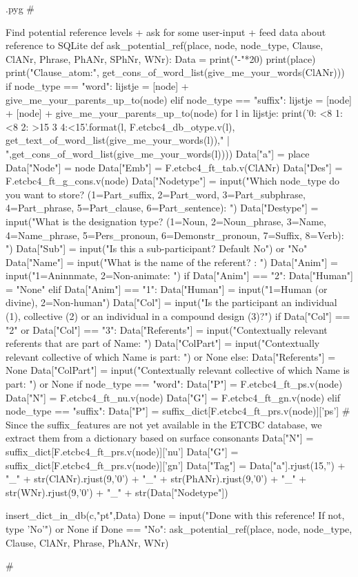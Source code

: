 \documentclass{report}
\makeatletter
\newenvironment{python}{%
  \VerbatimEnvironment
  \minted@resetoptions
  \setkeys{minted@opt}{}
      \begin{VerbatimOut}{\jobname.pyg}}
{%
      \end{VerbatimOut}
      \minted@pygmentize{python}
      \DeleteFile{\jobname.pyg}}
\makeatother
\begin{document}
\begin{python}
#{{{ Find potential reference levels + ask for some user-input + feed data about reference to SQLite
def ask_potential_ref(place, node, node_type, Clause, ClANr, Phrase, PhANr, SPhNr, WNr):
        Data = {}
        print("-"*20)
        print(place)
        print("Clause_atom:", get_cons_of_word_list(give_me_your_words(ClANr)))
        if node_type == "word":
                lijstje = [node] + give_me_your_parents_up_to(node)
        elif node_type == "suffix":
                lijstje = [node] + [node] + give_me_your_parents_up_to(node)
        for l in lijstje:
                print('{0: <8} {1: <8} {2: >15} {3} {4:<15}'.format(l, F.etcbc4_db_otype.v(l), get_text_of_word_list(give_me_your_words(l))," | ",get_cons_of_word_list(give_me_your_words(l))))
        Data["a"] = place
        Data["Node"] = node
        Data["Emb"] = F.etcbc4_ft_tab.v(ClANr)
        Data["Des"] = F.etcbc4_ft_g_cons.v(node)
        Data["Nodetype"] = input("Which node_type do you want to store? (1=Part_suffix, 2=Part_word, 3=Part_subphrase, 4=Part_phrase, 5=Part_clause, 6=Part_sentence): ")
        Data["Destype"] = input("What is the designation type? (1=Noun, 2=Noun_phrase, 3=Name, 4=Name_phrase, 5=Pers_pronoun, 6=Demonstr_pronoun, 7=Suffix, 8=Verb): ")
        Data["Sub"] = input("Is this a sub-participant? Default No") or "No"
        Data["Name"] = input("What is the name of the referent? : ")
        Data["Anim"] = input("1=Aninnmate, 2=Non-animate: ")
        if Data["Anim"] == "2":
            Data["Human"] = "None"
        elif Data["Anim"] == "1":
            Data["Human"] = input("1=Human (or divine), 2=Non-human")
        Data["Col"] = input("Is the participant an individual (1), collective (2) or an individual in a compound design (3)?")
        if Data["Col"] == "2" or Data["Col"] == "3":
            Data["Referents"] = input("Contextually relevant referents that are part of Name: ")
            Data["ColPart"] = input("Contextually relevant collective of which Name is part: ") or None
        else:
            Data["Referents"] = None
            Data["ColPart"] = input("Contextually relevant collective of which Name is part: ") or None
        if node_type == "word":
            Data["P"] = F.etcbc4_ft_ps.v(node)
            Data["N"] = F.etcbc4_ft_nu.v(node)
            Data["G"] = F.etcbc4_ft_gn.v(node)
        elif node_type == "suffix":
            Data["P"] = suffix_dict[F.etcbc4_ft_prs.v(node)]['ps']    # Since the suffix_features are not yet available in the ETCBC database, we extract them from a dictionary based on surface consonants
            Data["N"] = suffix_dict[F.etcbc4_ft_prs.v(node)]['nu']
            Data["G"] = suffix_dict[F.etcbc4_ft_prs.v(node)]['gn']
        Data["Tag"] = Data["a"].rjust(15,'') + "_" + str(ClANr).rjust(9,'0') + "_" + str(PhANr).rjust(9,'0') + "_" + str(WNr).rjust(9,'0') + "_" + str(Data["Nodetype"])

        insert_dict_in_db(c,"pt",Data)
		Done = input("Done with this reference! If not, type 'No'") or None
			if Done == "No":
				ask_potential_ref(place, node, node_type, Clause, ClANr, Phrase, PhANr, WNr)
    
#}}}
\end{python}
\end{document}
